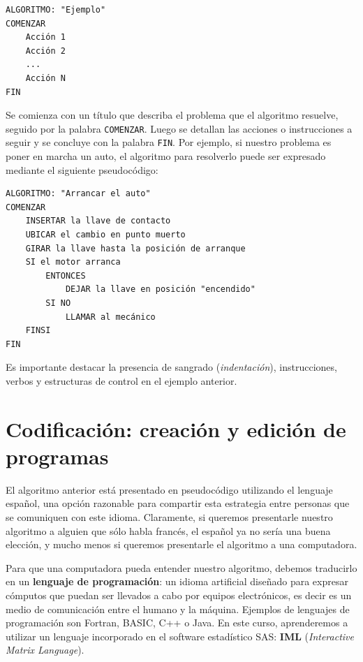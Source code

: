 \documentclass[]{book}
\begin{document}
\begin{verbatim}
ALGORITMO: "Ejemplo"
COMENZAR
    Acción 1
    Acción 2
    ...
    Acción N
FIN
\end{verbatim}

Se comienza con un título que describa el problema que el algoritmo resuelve, seguido por la palabra \texttt{COMENZAR}. Luego se detallan las acciones o instrucciones a seguir y se concluye con la palabra \texttt{FIN}. Por ejemplo, si nuestro problema es poner en marcha un auto, el algoritmo para resolverlo puede ser expresado mediante el siguiente pseudocódigo:

\begin{verbatim}
ALGORITMO: "Arrancar el auto"
COMENZAR
    INSERTAR la llave de contacto
    UBICAR el cambio en punto muerto
    GIRAR la llave hasta la posición de arranque
    SI el motor arranca 
        ENTONCES
            DEJAR la llave en posición "encendido"
        SI NO
            LLAMAR al mecánico
    FINSI
FIN
\end{verbatim}

Es importante destacar la presencia de sangrado (\emph{indentación}), instrucciones, verbos y estructuras de control en el ejemplo anterior.

\hypertarget{codificacion-creacion-y-edicion-de-programas}{%
\section{Codificación: creación y edición de programas}\label{codificacion-creacion-y-edicion-de-programas}}

El algoritmo anterior está presentado en pseudocódigo utilizando el lenguaje español, una opción razonable para compartir esta estrategia entre personas que se comuniquen con este idioma. Claramente, si queremos presentarle nuestro algoritmo a alguien que sólo habla francés, el español ya no sería una buena elección, y mucho menos si queremos presentarle el algoritmo a una computadora.

Para que una computadora pueda entender nuestro algoritmo, debemos traducirlo en un \textbf{lenguaje de programación}: un idioma artificial diseñado para expresar cómputos que puedan ser llevados a cabo por equipos electrónicos, es decir es un medio de comunicación entre el humano y la máquina. Ejemplos de lenguajes de programación son Fortran, BASIC, C++ o Java. En este curso, aprenderemos a utilizar un lenguaje incorporado en el software estadístico SAS: \textbf{IML} (\emph{Interactive Matrix Language}).
\end{document}
